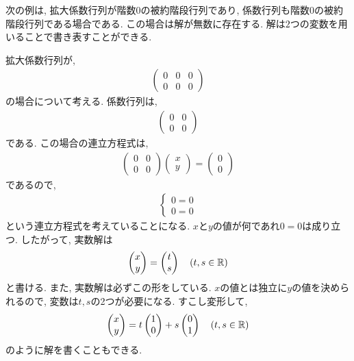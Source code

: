 次の例は,
拡大係数行列が階数$0$の被約階段行列であり,
係数行列も階数$0$の被約階段行列である場合である.
この場合は解が無数に存在する.
解は$2$つの変数を用いることで書き表すことができる.
\begin{example}
      \label{eg:eq:reduced:7}
  拡大係数行列が,
  \begin{align*}
    \begin{pmatrix}
      0&0&0\\0&0&0
    \end{pmatrix}
  \end{align*}
  の場合について考える.
  係数行列は,
  \begin{align*}
    \begin{pmatrix}
      0&0\\0&0
    \end{pmatrix}
  \end{align*}
  である.
この場合の連立方程式は,
  \begin{align*}
    \begin{pmatrix}
      0&0\\0&0
    \end{pmatrix}
    \begin{pmatrix}x\\y\end{pmatrix}
      =
      \begin{pmatrix}
        0\\0
      \end{pmatrix}
  \end{align*}
  であるので,
  \begin{align*}
    \begin{cases}
      0=0\\
      0=0
    \end{cases}
  \end{align*}
  という連立方程式を考えていることになる.
  $x$と$y$の値が何であれ$0=0$は成り立つ.
  したがって, 実数解は
  \begin{align*}
    \begin{pmatrix}x\\y\end{pmatrix}
      =
      \begin{pmatrix}t\\s\end{pmatrix}
        \quad (t,s\in\mathbb{R})
  \end{align*}
  と書ける.  また, 実数解は必ずこの形をしている.
  $x$の値とは独立に$y$の値を決められるので,
  変数は$t,s$の2つが必要になる.
  すこし変形して,
  \begin{align*}
    \begin{pmatrix}x\\y\end{pmatrix}
      =
      t\begin{pmatrix}1\\0\end{pmatrix}
        +
        s\begin{pmatrix}0\\1\end{pmatrix}
        \quad (t,s\in\mathbb{R})
  \end{align*}
  のように解を書くこともできる.
\end{example}

